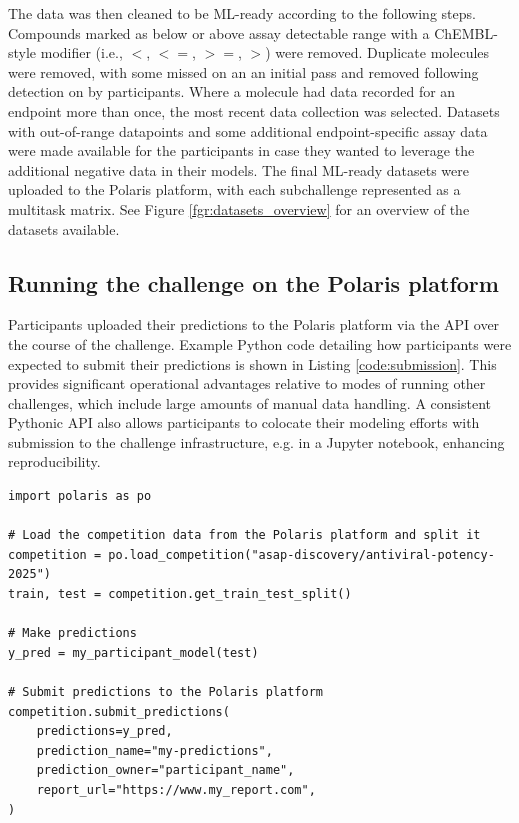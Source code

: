 \documentclass[journal=jcim,manuscript=article]{achemso}
\newenvironment{code}{\captionsetup{type=listing}}{}
\begin{document}
The data was then cleaned to be ML-ready according to the following steps. Compounds marked as below or above assay detectable range with a ChEMBL\cite{zdrazil_2024_chembl}-style modifier (i.e., $<$, $<=$, $>=$, $>$) were removed. Duplicate molecules were removed, with some missed on an an initial pass and removed following detection on by participants. Where a molecule had data recorded for an endpoint more than once, the most recent data collection was selected. Datasets with out-of-range datapoints and some additional endpoint-specific assay data were made available for the participants in case they wanted to leverage the additional negative data in their models. The final ML-ready datasets were uploaded to the Polaris platform, with each subchallenge represented as a multitask matrix. See Figure \ref{fgr:datasets_overview} for an overview of the datasets available. 

\subsection{Running the challenge on the Polaris platform}

Participants uploaded their predictions to the Polaris platform via the API over the course of the challenge. Example Python code detailing how participants were expected to submit their predictions is shown in Listing \ref{code:submission}. This provides significant operational advantages relative to modes of running other challenges, which include large amounts of manual data handling. A consistent Pythonic API also allows participants to colocate their modeling efforts with submission to the challenge infrastructure, e.g. in a Jupyter notebook\cite{kluyver_2016_jupyter}, enhancing reproducibility.

\begin{code}
\label{code:submission}
\begin{verbatim}
import polaris as po

# Load the competition data from the Polaris platform and split it
competition = po.load_competition("asap-discovery/antiviral-potency-2025")
train, test = competition.get_train_test_split()

# Make predictions
y_pred = my_participant_model(test)

# Submit predictions to the Polaris platform
competition.submit_predictions(
    predictions=y_pred,
    prediction_name="my-predictions",
    prediction_owner="participant_name",
    report_url="https://www.my_report.com",
)
\end{verbatim}
\end{code}
\end{document}
